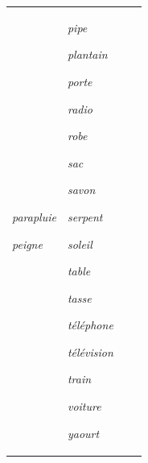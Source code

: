 \documentclass[output=paper,newtxmath,modfonts,nonflat,draftmode]{langsci/langscibook}
\begin{document}
\begin{tabularx}{\textwidth}{XXXX}
\textit{parapluie}

\textit{peigne} & \textit{pipe}

\textit{plantain~}

\textit{porte}

\textit{radio}

\textit{robe}

\textit{sac}

\textit{savon}

\textit{serpent}

\textit{soleil}

\textit{table}

\textit{tasse}

\textit{téléphone}

\textit{télévision}

\textit{train}

\textit{voiture}

\textit{yaourt}\\
\end{tabularx}
\end{document}
